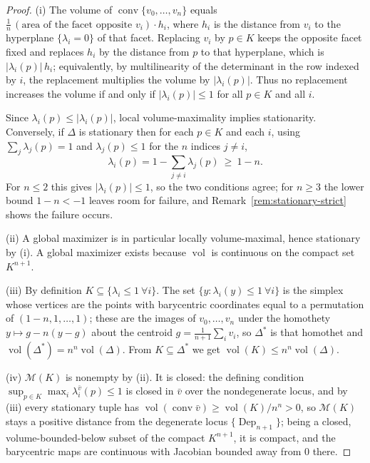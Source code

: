 \documentclass[11pt]{amsart}
\theoremstyle{definition}
\newcommand{\Dep}{\operatorname{Dep}}
\newcommand{\conv}{\operatorname{conv}}
\begin{document}
\begin{proof}
(i) The volume of $\conv\{v_0,\dots,v_n\}$ equals
$\tfrac1n\,(\text{area of the facet opposite }v_i)\cdot h_i$, where $h_i$ is
the distance from $v_i$ to the hyperplane $\{\lambda_i=0\}$ of that facet.
Replacing $v_i$ by $p\in K$ keeps the opposite facet fixed and replaces
$h_i$ by the distance from $p$ to that hyperplane, which is
$|\lambda_i(p)|\,h_i$; equivalently, by multilinearity of the determinant in
the row indexed by $i$, the replacement multiplies the volume by
$|\lambda_i(p)|$. Thus no replacement increases the volume if and only if
$|\lambda_i(p)|\le1$ for all $p\in K$ and all $i$.

Since $\lambda_i(p)\le|\lambda_i(p)|$, local volume-maximality implies
stationarity. Conversely, if $\Delta$ is stationary then for each $p\in K$
and each $i$, using $\sum_j\lambda_j(p)=1$ and $\lambda_j(p)\le1$ for the
$n$ indices $j\ne i$,
\[
\lambda_i(p)=1-\sum_{j\ne i}\lambda_j(p)\ \ge\ 1-n .
\]
For $n\le2$ this gives $|\lambda_i(p)|\le1$, so the two conditions agree;
for $n\ge3$ the lower bound $1-n<-1$ leaves room for failure, and
Remark~\ref{rem:stationary-strict} shows the failure occurs.

(ii) A global maximizer is in particular locally volume-maximal, hence
stationary by (i).
A global maximizer exists because $\operatorname{vol}$ is continuous on the
compact set $K^{n+1}$.

(iii) By definition $K\subseteq\{\lambda_i\le1\ \forall i\}$. The set
$\{y:\lambda_i(y)\le1\ \forall i\}$ is the simplex whose vertices are the
points with barycentric coordinates equal to a permutation of
$(1-n,1,\dots,1)$; these are the images of $v_0,\dots,v_n$ under the
homothety $y\mapsto g-n(y-g)$ about the centroid
$g=\frac1{n+1}\sum_iv_i$, so $\Delta^*$ is that homothet and
$\operatorname{vol}(\Delta^*)=n^{n}\operatorname{vol}(\Delta)$. From
$K\subseteq\Delta^*$ we get
$\operatorname{vol}(K)\le n^{n}\operatorname{vol}(\Delta)$.

(iv) $\mathcal M(K)$ is nonempty by (ii). It is closed: the defining
condition $\sup_{p\in K}\max_i\lambda_i^{\bar v}(p)\le1$ is closed in
$\bar v$ over the nondegenerate locus, and by (iii) every stationary tuple
has $\operatorname{vol}(\conv\bar v)\ge\operatorname{vol}(K)/n^n>0$, so
$\mathcal M(K)$ stays a positive distance from the degenerate locus
$\{\Dep_{n+1}\}$; being a closed, volume-bounded-below subset of the compact
$K^{n+1}$, it is compact, and the barycentric maps are continuous with
Jacobian bounded away from $0$ there.
\end{proof}
\end{document}
